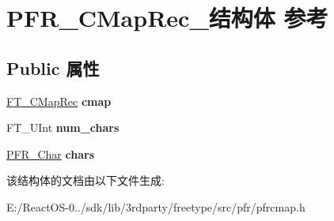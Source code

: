 \hypertarget{struct_p_f_r___c_map_rec__}{}\section{P\+F\+R\+\_\+\+C\+Map\+Rec\+\_\+结构体 参考}
\label{struct_p_f_r___c_map_rec__}
\subsection*{Public 属性}
\begin{DoxyCompactItemize}
\item 
\mbox{\label{struct_p_f_r___c_map_rec___aac7d23032dde3bddb90fd6c9fce72503}} 
\hyperlink{struct_f_t___c_map_rec__}{F\+T\+\_\+\+C\+Map\+Rec} {\bfseries cmap}
\item 
\mbox{\label{struct_p_f_r___c_map_rec___a6999763c66978fd0598cdd7b4c139b74}} 
F\+T\+\_\+\+U\+Int {\bfseries num\+\_\+chars}
\item 
\mbox{\label{struct_p_f_r___c_map_rec___ac323c13a0618f168e2604ea8a9529803}} 
\hyperlink{struct_p_f_r___char_rec__}{P\+F\+R\+\_\+\+Char} {\bfseries chars}
\end{DoxyCompactItemize}


该结构体的文档由以下文件生成\+:\begin{DoxyCompactItemize}
\item 
E\+:/\+React\+O\+S-\/0../sdk/lib/3rdparty/freetype/src/pfr/pfrcmap.\+h\end{DoxyCompactItemize}
